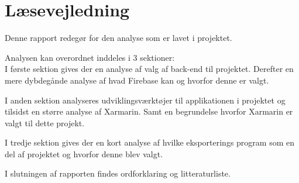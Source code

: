 \chapter*{Læsevejledning}
Denne rapport redegør for den analyse som er lavet i projektet. 

Analysen kan overordnet inddeles i 3 sektioner:\\
I første sektion gives der en analyse af valg af back-end til projektet. Derefter en mere dybdegånde analyse af hvad Firebase kan og hvorfor denne er valgt.

I anden sektion analyseres udviklingsværktøjer til applikationen i projektet og tilsidst en større analyse af Xarmarin. Samt en begrundelse hvorfor Xarmarin er valgt til dette projekt.

I tredje sektion gives der en kort analyse af hvilke eksporterings program som en del af projektet og hvorfor denne blev valgt.

I slutningen af rapporten findes ordforklaring og litteraturliste.
